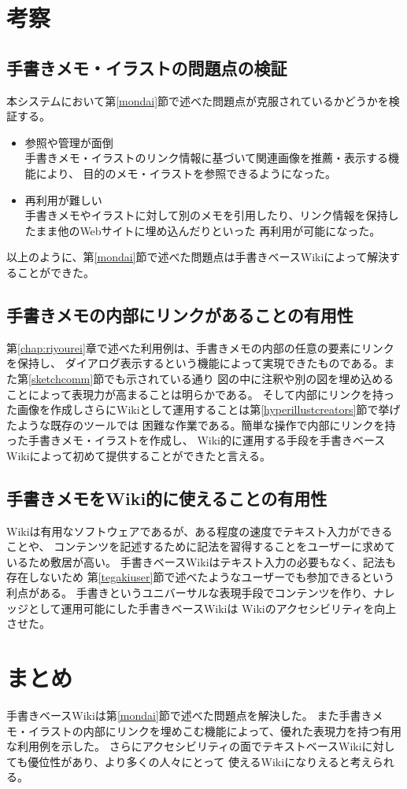\section{考察}


\subsection{手書きメモ・イラストの問題点の検証}
本システムにおいて第\ref{mondai}節で述べた問題点が克服されているかどうかを検証する。
\begin{itemize}
    \item 参照や管理が面倒\\
    手書きメモ・イラストのリンク情報に基づいて関連画像を推薦・表示する機能により、
    目的のメモ・イラストを参照できるようになった。
    \item 再利用が難しい\\
    手書きメモやイラストに対して別のメモを引用したり、リンク情報を保持したまま他のWebサイトに埋め込んだりといった
    再利用が可能になった。
\end{itemize}
以上のように、第\ref{mondai}節で述べた問題点は手書きベースWikiによって解決することができた。

\subsection{手書きメモの内部にリンクがあることの有用性}
第\ref{chap:riyourei}章で述べた利用例は、手書きメモの内部の任意の要素にリンクを保持し、
ダイアログ表示するという機能によって実現できたものである。また第\ref{sketchcomm}節でも示されている通り
図の中に注釈や別の図を埋め込めることによって表現力が高まることは明らかである。
そして内部にリンクを持った画像を作成しさらにWikiとして運用することは第\ref{hyperillustcreators}節で挙げたような既存のツールでは
困難な作業である。簡単な操作で内部にリンクを持った手書きメモ・イラストを作成し、
Wiki的に運用する手段を手書きベースWikiによって初めて提供することができたと言える。

\subsection{手書きメモをWiki的に使えることの有用性}
Wikiは有用なソフトウェアであるが、ある程度の速度でテキスト入力ができることや、
コンテンツを記述するために記法を習得することをユーザーに求めているため敷居が高い。
手書きベースWikiはテキスト入力の必要もなく、記法も存在しないため
第\ref{tegakiuser}節で述べたようなユーザーでも参加できるという利点がある。
手書きというユニバーサルな表現手段でコンテンツを作り、ナレッジとして運用可能にした手書きベースWikiは
Wikiのアクセシビリティを向上させた。

\section{まとめ}
手書きベースWikiは第\ref{mondai}節で述べた問題点を解決した。
また手書きメモ・イラストの内部にリンクを埋めこむ機能によって、優れた表現力を持つ有用な利用例を示した。
さらにアクセシビリティの面でテキストベースWikiに対しても優位性があり、より多くの人々にとって
使えるWikiになりえると考えられる。